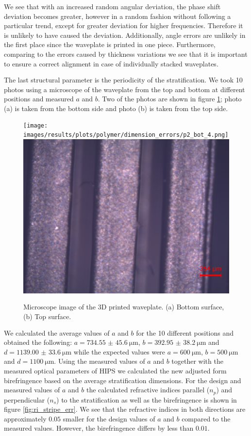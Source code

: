 We see that with an increased random angular deviation, the phase shift deviation becomes greater, however in a random fashion without following a particular trend, except for greater deviation for higher frequencies. Therefore it is unlikely to have caused the deviation. Additionally, angle errors are unlikely in the first place since the waveplate is printed in one piece. Furthermore, comparing to the errors caused by thickness variations we see that it is important to ensure a correct alignment in case of individually stacked waveplates. 

The last structural parameter is the periodicity of the stratification. We took 10 photos using a microscope of the waveplate from the top and bottom at different positions and measured $a$ and $b$. Two of the photos are shown in figure \ref{fig:hips_wp_photos}; photo (a) is taken from the bottom side and photo (b) is taken from the top side.

\begin{figure}[H]
\centering
    \subcaptionbox{\label{fig:p2bot4}}
        {\hspace*{-2em}\texttt{[image: images/results/plots/polymer/dimension\_errors/p2\_bot\_4.png]}}
    \qquad
    \subcaptionbox{\label{fig:p2top2}}
        {\hspace*{-2em}\includegraphics[width=0.4\linewidth]{images/results/plots/polymer/dimension_errors/p2_top_2.png}}
    \caption{Microscope image of the 3D printed waveplate. (a) Bottom surface, (b) Top surface.}
\label{fig:hips_wp_photos}
\end{figure}

We calculated the average values of $a$ and $b$ for the 10 different positions and obtained the following: $a=\SI[separate-uncertainty = true]{734.55(4560)}{\micro \meter}$, $b=\SI[separate-uncertainty = true]{392.95(3820)}{\micro \meter}$ and $d=\SI[separate-uncertainty = true]{1139.00(3360)}{\micro \meter}$ while the expected values were $a=\SI{600}{\micro \meter}$, $b=\SI{500}{\micro \meter}$ and $d=\SI{1100}{\micro \meter}$. Using the measured values of $a$ and $b$ together with the measured optical parameters of HIPS we calculated the new adjusted form birefringence based on the average stratification dimensions. For the design and measured values of $a$ and $b$ the calculated refractive indices parallel ($n_p$) and perpendicular ($n_s$) to the stratification as well as the birefringence is shown in figure \ref{fig:ri_stripe_err}. We see that the refractive indices in both directions are approximately $0.05$ smaller for the design values of $a$ and $b$ compared to the measured values. However, the birefringence differs by less than $0.01$.

